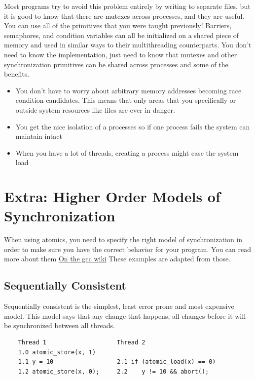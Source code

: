 Most programs try to avoid this problem entirely by writing to separate files, but it is good to know that there are mutexes across processes, and they are useful.
You can use all of the primitives that you were taught previously! Barriers, semaphores, and condition variables can all be initialized on a shared piece of memory and used in similar ways to their multithreading counterparts.
You don't need to know the implementation, just need to know that mutexes and other synchronization primitives can be shared across processes and some of the benefits.

\begin{itemize}
\tightlist
\item
  You don't have to worry about arbitrary memory addresses becoming race condition candidates. This means that only areas that you specifically  or outside system resources like files are ever in danger.
\item
  You get the nice isolation of a processes so if one process fails the system can maintain intact
\item
  When you have a lot of threads, creating a process might ease the system load
\end{itemize}

\section{Extra: Higher Order Models of Synchronization}

When using atomics, you need to specify the right model of synchronization in order to make sure you have the correct behavior for your program.
You can read more about them \href{https://gcc.gnu.org/wiki/Atomic/GCCMM/AtomicSync}{On the gcc wiki}
These examples are adapted from those.

\subsection{Sequentially Consistent}

Sequentially consistent is the simplest, least error prone and most expensive model. This model says that any change that happens, all changes before it will be synchronized between all threads.

\begin{verbatim}
    Thread 1                    Thread 2
    1.0 atomic_store(x, 1)
    1.1 y = 10                  2.1 if (atomic_load(x) == 0)
    1.2 atomic_store(x, 0);     2.2    y != 10 && abort();
\end{verbatim}


